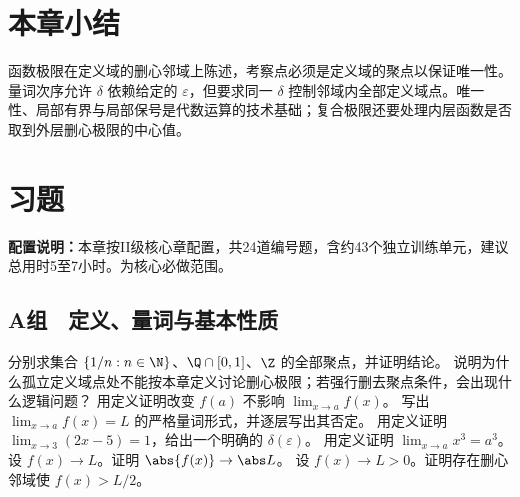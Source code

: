 \section*{本章小结}

函数极限在定义域的删心邻域上陈述，考察点必须是定义域的聚点以保证唯一性。量词次序允许 \(\delta\) 依赖给定的 \(\varepsilon\)，但要求同一 \(\delta\) 控制邻域内全部定义域点。唯一性、局部有界与局部保号是代数运算的技术基础；复合极限还要处理内层函数是否取到外层删心极限的中心值。

\section*{习题}

\noindent\textbf{配置说明：}本章按II级核心章配置，共24道编号题，含约43个独立训练单元，建议总用时5至7小时。为核心必做范围。

\subsection*{A组　定义、量词与基本性质}
\begin{enumerate}[label=\textbf{14.\arabic*.}]
  \mustdo 分别求集合 \(\{1/n:n\in\N\}\)、\(\Q\cap[0,1]\)、\(\Z\) 的全部聚点，并证明结论。
  \mustdo 说明为什么孤立定义域点处不能按本章定义讨论删心极限；若强行删去聚点条件，会出现什么逻辑问题？
  \mustdo 用定义证明改变 \(f(a)\) 不影响 \(\lim_{x\to a}f(x)\)。
  \mustdo 写出 \(\lim_{x\to a}f(x)=L\) 的严格量词形式，并逐层写出其否定。
  \mustdo 用定义证明 \(\lim_{x\to3}(2x-5)=1\)，给出一个明确的 \(\delta(\varepsilon)\)。
  \mustdo 用定义证明 \(\lim_{x\to a}x^3=a^3\)。
  \mustdo 设 \(f(x)\to L\)。证明 \(\abs{f(x)}\to\abs L\)。
  \mustdo 设 \(f(x)\to L>0\)。证明存在删心邻域使 \(f(x)>L/2\)。
\end{enumerate}

